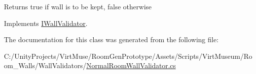 \begin{DoxyReturn}{Returns}
true if wall is to be kept, false otherwise
\end{DoxyReturn}


Implements \mbox{\hyperlink{interface_i_wall_validator_a1618acf45bf2614985aeb8b240bf7da8}{I\+Wall\+Validator}}.



The documentation for this class was generated from the following file\+:\begin{DoxyCompactItemize}
\item 
C\+:/\+Unity\+Projects/\+Virt\+Muse/\+Room\+Gen\+Prototype/\+Assets/\+Scripts/\+Virt\+Museum/\+Room\+\_\+\+Walls/\+Wall\+Validators/\mbox{\hyperlink{_normal_room_wall_validator_8cs}{Normal\+Room\+Wall\+Validator.\+cs}}\end{DoxyCompactItemize}
